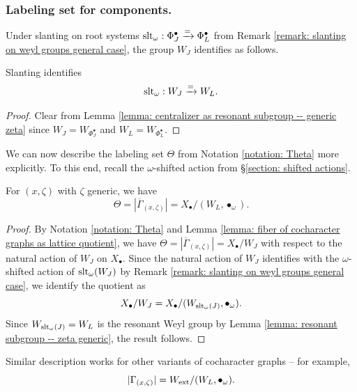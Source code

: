 \subsubsection{Labeling set for components.}
Under slanting on root systems $\operatorname{slt}_{\omega}: \Phi^{\bullet}_J \xrightarrow{=} \Phi^{\bullet}_L$ from Remark \ref{remark: slanting on weyl groups general case}, the group $W_J$ identifies as follows.
\begin{lemma}\label{lemma: resonant subgroup -- zeta generic}
Slanting identifies
\begin{equation*}
    \operatorname{slt}_{\omega}: W_J \xrightarrow{=} W_L.
\end{equation*}
\end{lemma}
\begin{proof}
Clear from Lemma \ref{lemma: centralizer as resonant subgroup -- generic zeta} since $W_J = W_{\Phi^{\bullet}_J}$ and $W_L = W_{\Phi^{\bullet}_L}$.   
\end{proof}


We can now describe the labeling set $\Theta$ from Notation \ref{notation: Theta} more explicitly.
To this end, recall the $\omega$-shifted action from \S \ref{section: shifted actions}.
\begin{lemma}\label{lemma: labeling set for components -- zeta generic}
For $(x, \zeta)$ with $\zeta$ generic, we have
\begin{equation*}
 \Theta = |\overline{\Gamma}_{(x, \zeta)}|  = X_{\bullet} / (W_{L}, \bullet_{\omega}).
\end{equation*}
\end{lemma}
\begin{proof}
 By Notation \ref{notation: Theta} and Lemma \ref{lemma: fiber of cocharacter graphs as lattice quotient}, we have $\Theta = |\overline{\Gamma}_{(x, \zeta)}|  = X_{\bullet}/W_J$ with respect to the natural action of $W_J$ on $X_{\bullet}$. Since the natural action of $W_J$ identifies with the $\omega$-shifted action of $\operatorname{slt}_{\omega}(W_J)$ by Remark \ref{remark: slanting on weyl groups general case}, we identify the quotient as
 \begin{equation*}
     X_{\bullet}/W_J = X_{\bullet}/(W_{\operatorname{slt}_{\omega}(J)}, \bullet_{\omega}).
 \end{equation*}
Since $W_{\operatorname{slt}_{\omega}(J)} = W_L$ is the resonant Weyl group by Lemma \ref{lemma: resonant subgroup -- zeta generic}, the result follows.
\end{proof}

\begin{remark}
Similar description works for other variants of cocharacter graphs -- for example,  
\begin{equation*}
   |{\Gamma}_{(x, \zeta)}|  = W_{\mathrm{ext}} / (W_{L}, \bullet_{\omega}). 
\end{equation*}
\end{remark}




